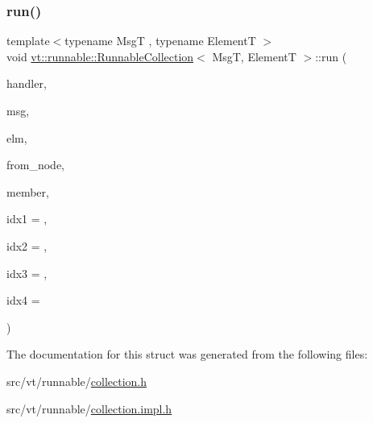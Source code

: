 \subsubsection{\texorpdfstring{run()}{run()}}
{\footnotesize\ttfamily template$<$typename MsgT , typename ElementT $>$ \\
void \hyperlink{structvt_1_1runnable_1_1_runnable_collection}{vt\+::runnable\+::\+Runnable\+Collection}$<$ MsgT, ElementT $>$\+::run (\begin{DoxyParamCaption}\item[{\hyperlink{namespacevt_af64846b57dfcaf104da3ef6967917573}{Handler\+Type}}]{handler,  }\item[{MsgT $\ast$}]{msg,  }\item[{ElementT $\ast$}]{elm,  }\item[{\hyperlink{namespacevt_a866da9d0efc19c0a1ce79e9e492f47e2}{Node\+Type}}]{from\+\_\+node,  }\item[{bool}]{member,  }\item[{uint64\+\_\+t}]{idx1 = {},  }\item[{uint64\+\_\+t}]{idx2 = {},  }\item[{uint64\+\_\+t}]{idx3 = {},  }\item[{uint64\+\_\+t}]{idx4 = {} }\end{DoxyParamCaption})\hspace{0.3cm}{\ttfamily [static]}}



The documentation for this struct was generated from the following files\+:\begin{DoxyCompactItemize}
\item 
src/vt/runnable/\hyperlink{collection_8h}{collection.\+h}\item 
src/vt/runnable/\hyperlink{collection_8impl_8h}{collection.\+impl.\+h}\end{DoxyCompactItemize}
